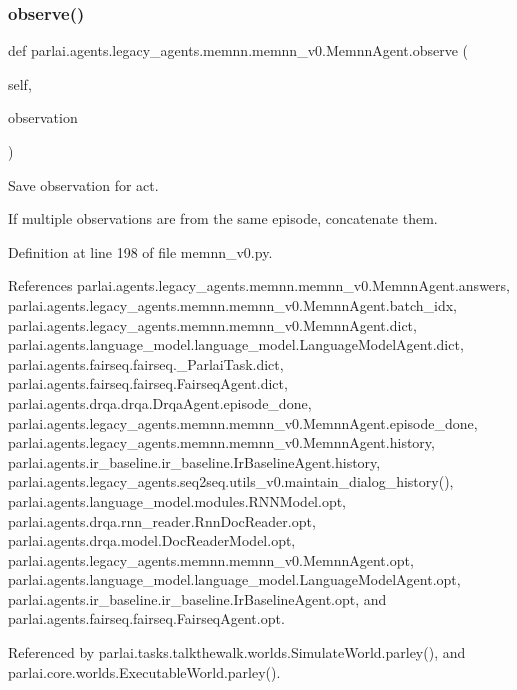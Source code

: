 \subsubsection{\texorpdfstring{observe()}{observe()}}
{\footnotesize\ttfamily def parlai.\+agents.\+legacy\+\_\+agents.\+memnn.\+memnn\+\_\+v0.\+Memnn\+Agent.\+observe (\begin{DoxyParamCaption}\item[{}]{self,  }\item[{}]{observation }\end{DoxyParamCaption})}

\begin{DoxyVerb}Save observation for act.

If multiple observations are from the same episode, concatenate them.
\end{DoxyVerb}
 

Definition at line 198 of file memnn\+\_\+v0.\+py.



References parlai.\+agents.\+legacy\+\_\+agents.\+memnn.\+memnn\+\_\+v0.\+Memnn\+Agent.\+answers, parlai.\+agents.\+legacy\+\_\+agents.\+memnn.\+memnn\+\_\+v0.\+Memnn\+Agent.\+batch\+\_\+idx, parlai.\+agents.\+legacy\+\_\+agents.\+memnn.\+memnn\+\_\+v0.\+Memnn\+Agent.\+dict, parlai.\+agents.\+language\+\_\+model.\+language\+\_\+model.\+Language\+Model\+Agent.\+dict, parlai.\+agents.\+fairseq.\+fairseq.\+\_\+\+Parlai\+Task.\+dict, parlai.\+agents.\+fairseq.\+fairseq.\+Fairseq\+Agent.\+dict, parlai.\+agents.\+drqa.\+drqa.\+Drqa\+Agent.\+episode\+\_\+done, parlai.\+agents.\+legacy\+\_\+agents.\+memnn.\+memnn\+\_\+v0.\+Memnn\+Agent.\+episode\+\_\+done, parlai.\+agents.\+legacy\+\_\+agents.\+memnn.\+memnn\+\_\+v0.\+Memnn\+Agent.\+history, parlai.\+agents.\+ir\+\_\+baseline.\+ir\+\_\+baseline.\+Ir\+Baseline\+Agent.\+history, parlai.\+agents.\+legacy\+\_\+agents.\+seq2seq.\+utils\+\_\+v0.\+maintain\+\_\+dialog\+\_\+history(), parlai.\+agents.\+language\+\_\+model.\+modules.\+R\+N\+N\+Model.\+opt, parlai.\+agents.\+drqa.\+rnn\+\_\+reader.\+Rnn\+Doc\+Reader.\+opt, parlai.\+agents.\+drqa.\+model.\+Doc\+Reader\+Model.\+opt, parlai.\+agents.\+legacy\+\_\+agents.\+memnn.\+memnn\+\_\+v0.\+Memnn\+Agent.\+opt, parlai.\+agents.\+language\+\_\+model.\+language\+\_\+model.\+Language\+Model\+Agent.\+opt, parlai.\+agents.\+ir\+\_\+baseline.\+ir\+\_\+baseline.\+Ir\+Baseline\+Agent.\+opt, and parlai.\+agents.\+fairseq.\+fairseq.\+Fairseq\+Agent.\+opt.



Referenced by parlai.\+tasks.\+talkthewalk.\+worlds.\+Simulate\+World.\+parley(), and parlai.\+core.\+worlds.\+Executable\+World.\+parley().

